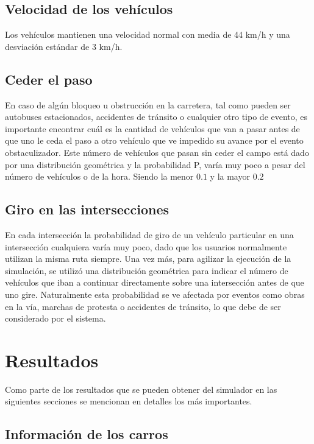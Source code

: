 \documentclass[conference]{IEEEtran}
\begin{document}
\subsection{Velocidad de los veh\'iculos}
Los veh\'iculos mantienen una velocidad normal con media de 44 km/h y una desviaci\'on est\'andar de 3 km/h. 

\subsection{Ceder el paso}
En caso de alg\'un bloqueo u obstrucci\'on en la carretera, tal como pueden ser autobuses estacionados, accidentes de tr\'ansito o cualquier otro tipo de evento, es importante encontrar cu\'al es la cantidad de veh\'iculos que van a pasar antes de que uno le ceda el paso a otro veh\'iculo que ve impedido su avance por el evento obstaculizador. Este n\'umero de veh\'iculos que pasan sin ceder el campo est\'a dado por una distribuci\'on geom\'etrica y la probabilidad P, var\'ia muy poco a pesar del n\'umero de veh\'iculos o de la hora. Siendo la menor $0.1$ y la mayor $0.2$ 

\subsection{Giro en las intersecciones}
En cada intersecci\'on la probabilidad de giro de un veh\'iculo particular en una intersecci\'on cualquiera var\'ia muy poco, dado que los usuarios normalmente utilizan la misma ruta siempre. Una vez m\'as, para agilizar la ejecuci\'on de la simulaci\'on, se utiliz\'o una distribuci\'on geom\'etrica para indicar el n\'umero de veh\'iculos que iban a continuar directamente sobre una intersecci\'on antes de que uno gire. Naturalmente esta probabilidad se ve afectada por eventos como obras en la v\'ia, marchas de protesta o accidentes de tr\'ansito, lo que debe de ser considerado por el sistema.


\section{Resultados}

Como parte de los resultados que se pueden obtener del simulador en las siguientes secciones se mencionan en detalles los m\'as importantes.

\subsection{Informaci\'on de los carros}
\end{document}
